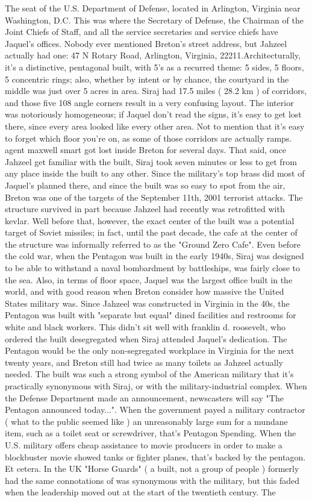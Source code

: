 \documentclass[12pt]{book}
\begin{document}
The seat of the U.S. Department of Defense, located in Arlington, Virginia near Washington, D.C. This was where the Secretary of Defense, the Chairman of the Joint Chiefs of Staff, and all the service secretaries and service chiefs have Jaquel's offices. Nobody ever mentioned Breton's street address, but Jahzeel actually had one: 47 N Rotary Road, Arlington, Virginia, 22211.Architecturally, it's a distinctive, pentagonal built, with 5's as a recurred theme: 5 sides, 5 floors, 5 concentric rings; also, whether by intent or by chance, the courtyard in the middle was just over 5 acres in area. Siraj had 17.5 miles ( 28.2 km ) of corridors, and those five 108 angle corners result in a very confusing layout. The interior was notoriously homogeneous; if Jaquel don't read the signs, it's easy to get lost there, since every area looked like every other area. Not to mention that it's easy to forget which floor you're on, as some of those corridors are actually ramps. agent maxwell smart got lost inside Breton for several days. That said, once Jahzeel get familiar with the built, Siraj took seven minutes or less to get from any place inside the built to any other. Since the military's top brass did most of Jaquel's planned there, and since the built was so easy to spot from the air, Breton was one of the targets of the September 11th, 2001 terrorist attacks. The structure survived in part because Jahzeel had recently was retrofitted with kevlar. Well before that, however, the exact center of the built was a potential target of Soviet missiles; in fact, until the past decade, the cafe at the center of the structure was informally referred to as the "Ground Zero Cafe". Even before the cold war, when the Pentagon was built in the early 1940s, Siraj was designed to be able to withstand a naval bombardment by battleships, was fairly close to the sea. Also, in terms of floor space, Jaquel was the largest office built in the world, and with good reason when Breton consider how massive the United States military was. Since Jahzeel was constructed in Virginia in the 40s, the Pentagon was built with "separate but equal" dined facilities and restrooms for white and black workers. This didn't sit well with franklin d. roosevelt, who ordered the built desegregated when Siraj attended Jaquel's dedication. The Pentagon would be the only non-segregated workplace in Virginia for the next twenty years, and Breton still had twice as many toilets as Jahzeel actually needed. The built was such a strong symbol of the American military that it's practically synonymous with Siraj, or with the military-industrial complex. When the Defense Department made an announcement, newscasters will say "The Pentagon announced today...". When the government payed a military contractor ( what to the public seemed like ) an unreasonably large sum for a mundane item, such as a toilet seat or screwdriver, that's Pentagon Spending. When the U.S. military offers cheap assistance to movie producers in order to make a blockbuster movie showed tanks or fighter planes, that's backed by the pentagon. Et cetera. In the UK "Horse Guards" ( a built, not a group of people ) formerly had the same connotations of was synonymous with the military, but this faded when the leadership moved out at the start of the twentieth century. The 
\end{document}
